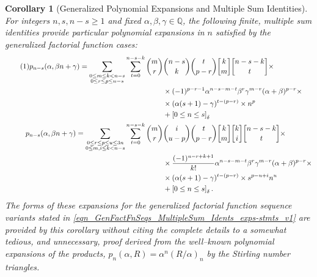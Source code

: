 \documentclass[12pt,reqno]{article}
\numberwithin{sfootnote}{section}
\numberwithin{equation}{section}
\newcommand{\tagonce}[0]{
     \addtocounter{equation}{1}
     \tag{\theequation}
}
\theoremstyle{DefaultTheoremStyle}
\newtheorem{cor}[theorem]{Corollary}
\theoremstyle{definition}
\newcommand{\gkpSI}[2]{\ensuremath{\genfrac{\lbrack}{\rbrack}{0pt}{}{#1}{#2}}}
\newcommand{\Pochhammer}[2]{\ensuremath{\left(#1\right)_{#2}}}
\newcommand{\Iverson}[1]{\ensuremath{\left[#1\right]_{\delta}}}
\begin{document}
\begin{cor}[Generalized Polynomial Expansions and Multiple Sum Identities] 
\label{cor_GenFactFnSeqs_MultipleSummationIdents} 
For integers $n,s,n-s \geq 1$ and fixed 
$\alpha, \beta, \gamma \in \mathbb{Q}$, the 
following finite, multiple sum identities provide 
particular polynomial expansions in $n$ satisfied by the 
generalized factorial function cases: 
\begin{align*} 
\tagonce\label{eqn_GenFactFnSeqs_MultipleSum_Idents_exps-stmts_v1} 
p_{n-s}(\alpha, \beta n + \gamma) = 
     \sum\limits_{
          \substack{0 \leq m \leq k < n-s \\ 0 \leq r \leq p \leq n-s}
          } 
     \sum_{t=0}^{n-s-k} 
     \binom{m}{r} & \binom{n-s}{k} \binom{t}{p-r} 
     \gkpSI{k}{m} \gkpSI{n-s-k}{t} 
     \times \\ 
     & \times 
     (-1)^{p-r-1} 
     \alpha^{n-s-m-t} \beta^{r} \gamma^{m-r} 
     (\alpha + \beta)^{p-r} \times \\ 
     & \times 
     (\alpha (s+1) - \gamma)^{t-(p-r)} \times n^{p} \\ 
     & + 
     \Iverson{0 \leq n \leq s} \\ 
p_{n-s}(\alpha, \beta n + \gamma) = 
     \sum\limits_{ 
          \substack{0 \leq r \leq p \leq u \leq 3n \\ 
          0 \leq m,i \leq k < n-s} 
          } 
     \sum_{t=0}^{n-s-k} 
     \binom{m}{r} & \binom{i}{u-p} \binom{t}{p-r} 
     \gkpSI{k}{m} \gkpSI{k}{i} \gkpSI{n-s-k}{t} \times \\ 
     & \times 
     \frac{(-1)^{u-r+k+1}}{k!} \alpha^{n-s-m-t} \beta^{r} \gamma^{m-r} 
     (\alpha + \beta)^{p-r} \times \\ 
     & \times 
     (\alpha (s+1) - \gamma)^{t-(p-r)} \times s^{p-u+i} n^{u} \\ 
     & + 
     \Iverson{0 \leq n \leq s}. 
\end{align*} 
The forms of these expansions for the generalized factorial function 
sequence variants stated in 
\eqref{eqn_GenFactFnSeqs_MultipleSum_Idents_exps-stmts_v1} 
are provided by this corollary without citing the complete details to 
a somewhat tedious, and unnecessary, proof derived from the 
well--known polynomial expansions of the products, 
$p_n(\alpha, R) = \alpha^{n} \Pochhammer{R / \alpha}{n}$ by the 
Stirling number triangles. 
\end{cor} 
\end{document}
